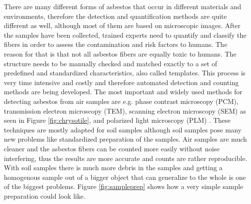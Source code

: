 There are many different forms of asbestos that occur in different materials and environments, therefore the detection and quantification methods are quite different as well, although most of them are based on microscopic images. After the samples have been collected, trained experts need to quantify and classify the fibers in order to assess the contamination and risk factors to humans. The reason for that is that not all asbestos fibers are equally toxic to humans. The structure needs to be manually checked and matched exactly to a set of predefined and standardized characteristics, also called templates. This process is very time intensive and costly and therefore automated detection and counting methods are being developed. The most important and widely used methods for detecting asbestos from air samples are e.g. phase contrast microscopy (PCM), transmission electron microscopy (TEM), scanning electron microscopy (SEM) as seen in Figure \ref{fig:chrysotile}, and polarized light microscopy (PLM) \cite{perry2004discussion}. These techniques are mostly adapted for soil samples although soil samples pose many new problems like standardized preparation of the samples. Air samples are much cleaner and the asbestos fibers can be counted more easily without noise interfering, thus the results are more accurate and counts are rather reproducible. With soil samples there is much more debris in the samples and getting a homogenous sample out of a bigger object that can generalize to the whole is one of the biggest problems. Figure \ref{fig:sampleprep} shows how a very simple sample preparation could look like. \\

